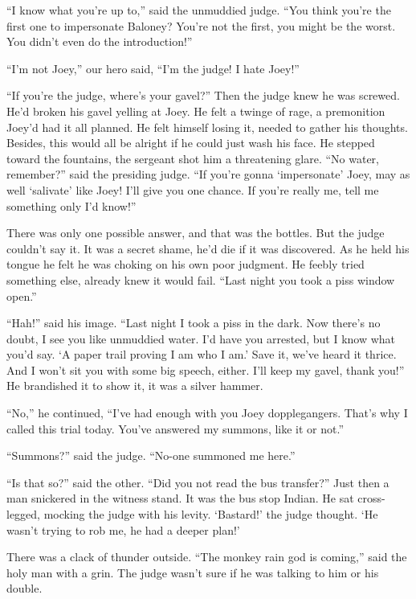 \documentclass[oneside]{book}
\begin{document}
``I know what you're up to,'' said the unmuddied judge.  ``You think you're the first one to
impersonate Baloney?  You're not the first, you might be the worst.  You didn't even
do the introduction!''

``I'm not Joey,'' our hero said, ``I'm the judge!  I hate Joey!''

``If you're the judge, where's your gavel?''  Then the judge knew he was screwed.  He'd broken his
gavel yelling at Joey.  He felt a twinge of rage, a premonition Joey'd had it all planned.
He felt himself losing it, needed to gather his thoughts.  Besides, this would all be alright if
he could just wash his face.  He stepped toward the fountains, the
sergeant shot him a threatening glare.  ``No water, remember?'' said the presiding judge.  ``If you're gonna
`impersonate' Joey, may as well `salivate' like Joey!  I'll give you one chance.  If you're really me, tell me
something only I'd know!''

There was only one possible answer, and that was the bottles.  But the judge couldn't say it.
It was a secret shame, he'd die if it was discovered.  As he held his tongue he felt he was
choking on his own poor judgment.  He feebly tried something else, already knew it would fail.
``Last night you took a piss window open.''

``Hah!'' said his image.  ``Last night I took a piss in the dark.  Now there's no doubt, I see
you like unmuddied water.  I'd have you arrested, but I know what you'd say.  `A paper trail proving
I am who I am.'  Save it, we've heard it thrice.  And I won't sit you with some big speech, either.
I'll keep my gavel, thank you!''
He brandished it to show it, it was a silver hammer.

``No,'' he continued, ``I've had enough with you Joey dopplegangers.
That's why I called this trial today.  You've answered my summons, like it or not.''

``Summons?'' said the judge.  ``No-one summoned me here.''

``Is that so?'' said the other.  ``Did you not read the bus transfer?''  Just then a man snickered
in the witness stand.  It was the bus stop Indian.  He sat cross-legged, mocking
the judge with his levity.  `Bastard!' the judge thought.
`He wasn't trying to rob me, he had a deeper plan!'

There was a clack of thunder outside.  ``The monkey rain god
is coming,'' said the holy man with a grin.  The judge wasn't sure if he was talking to him or his double.
\end{document}
